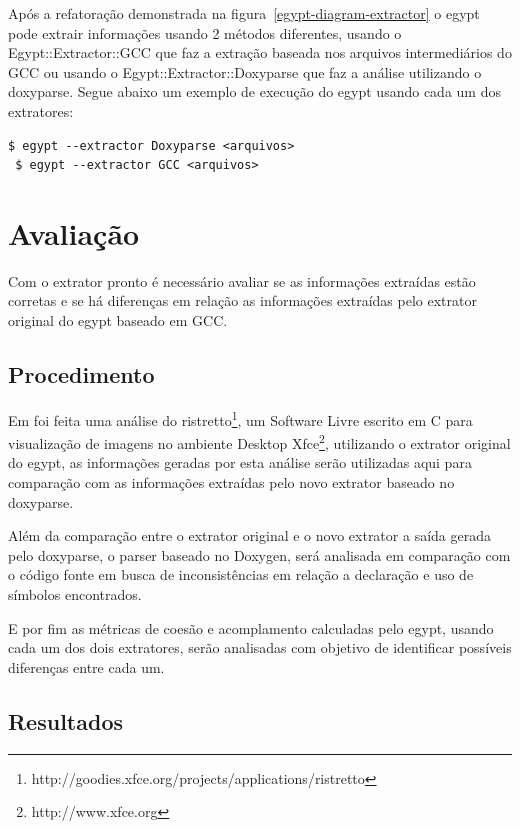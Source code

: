 Após a refatoração demonstrada na figura~\ref{egypt-diagram-extractor} o egypt
pode extrair informações usando 2 métodos diferentes, usando o
Egypt::Extractor::GCC que faz a extração baseada nos arquivos intermediários do
GCC ou usando o Egypt::Extractor::Doxyparse que faz a análise utilizando o
doxyparse. Segue abaixo um exemplo de execução do egypt usando cada um dos
extratores:

\begin{Verbatim}[frame=single,fontsize=\relsize{-2},fontfamily=courier]
 $ egypt --extractor Doxyparse <arquivos>
 $ egypt --extractor GCC <arquivos>
\end{Verbatim}

\chapter{Avaliação} \label{ch:avaliacao}

Com o extrator pronto é necessário avaliar se as informações extraídas estão
corretas e se há diferenças em relação as informações extraídas pelo extrator
original do egypt baseado em GCC.

\section{Procedimento}

Em \cite{structuralComplexityEvolution} foi feita uma análise do
ristretto\footnote{http://goodies.xfce.org/projects/applications/ristretto}, um
Software Livre escrito em C para visualização de imagens no ambiente Desktop
Xfce\footnote{http://www.xfce.org}, utilizando o extrator original do egypt, as
informações geradas por esta análise serão utilizadas aqui para comparação com
as informações extraídas pelo novo extrator baseado no doxyparse.

Além da comparação entre o extrator original e o novo extrator a saída
gerada pelo doxyparse, o parser baseado no Doxygen, será analisada em
comparação com o código fonte em busca de inconsistências em relação a
declaração e uso de símbolos encontrados.

E por fim as métricas de coesão e acomplamento calculadas pelo egypt, usando
cada um dos dois extratores, serão analisadas com objetivo de identificar
possíveis diferenças entre cada um.

\section{Resultados}

